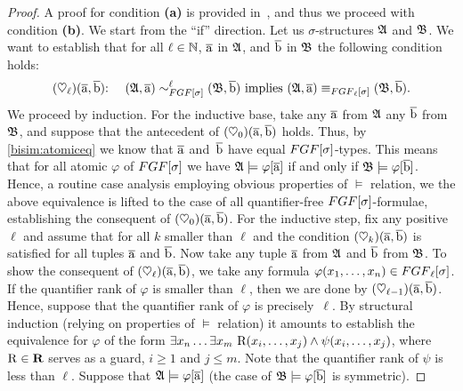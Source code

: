 
\begin{proof}
  A proof for condition \textbf{(a)} is provided in~\cite[Lemma 3]{BednarczykJ22}, and thus we proceed with condition \textbf{(b)}.
  We start from the ``if'' direction. 
  Let us $\sigma$-structures ${\mathfrak{A}}$ and ${\mathfrak{B}}$.
  We want to establish that for all $\ell \in {\mathbb{N}}$, $\overline{\mathrm{a}}$ in ${\mathfrak{A}}$, and $\overline{\mathrm{b}}$ in ${\mathfrak{B}}$ the following condition holds:
  \[
    (\heartsuit_\ell)(\elemtuplea, \elemtupleb){:} \ \ \ \  (\str{A}, \elemtuplea) \bisimto_{\FGF[\sigma]}^{\ell} (\str{B}, \elemtupleb) \ \text{implies} \ (\str{A}, \elemtuplea) \equiv_{\FGF_\ell[\sigma]} (\str{B}, \elemtupleb).
  \]
  We proceed by induction. 
  For the inductive base, take any $\overline{\mathrm{a}}$ from ${\mathfrak{A}}$ any $\overline{\mathrm{b}}$ from ${\mathfrak{B}}$, and suppose that the antecedent of $(\heartsuit_0)(\overline{\mathrm{a}},\overline{\mathrm{b}})$ holds.
  Thus, by \ref{bisim:atomiceq} we know that $\overline{\mathrm{a}}$ and~$\overline{\mathrm{b}}$ have equal $\FGF[\sigma]$-types.
  This means that for all atomic $\varphi$ of $\FGF[\sigma]$ we have ${\mathfrak{A}} \models \varphi[\overline{\mathrm{a}}]$ if and only if ${\mathfrak{B}} \models \varphi[\overline{\mathrm{b}}]$.
  Hence, a routine case analysis employing obvious properties of $\models$ relation, we the above equivalence is lifted to the case of all quantifier-free $\FGF[\sigma]$-formulae, establishing the consequent of $(\heartsuit_0)(\overline{\mathrm{a}},\overline{\mathrm{b}})$.
  For the inductive step, fix any positive $\ell$ and assume that for all $k$ smaller than $\ell$ and the condition $(\heartsuit_k)(\overline{\mathrm{a}},\overline{\mathrm{b}})$ is satisfied for all tuples $\overline{\mathrm{a}}$ and $\overline{\mathrm{b}}$.
  Now take any tuple $\overline{\mathrm{a}}$ from ${\mathfrak{A}}$ and $\overline{\mathrm{b}}$ from ${\mathfrak{B}}$.
  To show the consequent of $(\heartsuit_\ell)(\overline{\mathrm{a}},\overline{\mathrm{b}})$, we take any formula $\varphi(x_1, \ldots, x_n) \in \FGF_\ell[\sigma]$.
  If the quantifier rank of $\varphi$ is smaller than $\ell$, then we are done by $(\heartsuit_{\ell{-}1})(\overline{\mathrm{a}},\overline{\mathrm{b}})$.
  Hence, suppose that the quantifier rank of $\varphi$ is precisely~$\ell$.
  By structural induction (relying on properties of $\models$ relation) it amounts to establish the equivalence for $\varphi$ of the form $\exists{x_{n}} \ldots \exists{x_{m}}\ \mathrm{R}(x_{i}, \ldots, x_{j}) \land \psi(x_{i}, \ldots, x_{j})$, where $\mathrm{R} \in \mathbf{R}$ serves as a guard, $i \geq 1$ and $j \leq m$.
  Note that the quantifier rank of $\psi$ is less than $\ell$.
  Suppose that ${\mathfrak{A}} \models \varphi[\overline{\mathrm{a}}]$ (the case of ${\mathfrak{B}} \models \varphi[\overline{\mathrm{b}}]$ is symmetric).

\end{proof}
